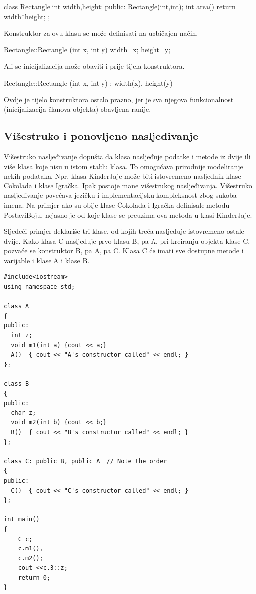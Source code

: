 \documentclass[11pt]{book}
\begin{document}
\begin{shortlisting}
  class Rectangle {
      int width,height;
      public:
      Rectangle(int,int);
      int area() {return width*height;}
    };
\end{shortlisting}

Konstruktor za ovu klasu se može definisati na uobičajen način.

\begin{shortlisting}
  Rectangle::Rectangle (int x, int y) { width=x; height=y; }
\end{shortlisting}

Ali se inicijalizacija može obaviti i prije tijela konstruktora.

\begin{shortlisting}
  Rectangle::Rectangle (int x, int y) : width(x), height(y) { }
\end{shortlisting}

Ovdje je tijelo konstruktora ostalo prazno, jer je sva njegova funkcionalnost (inicijalizacija članova objekta) obavljena ranije.

\subsection{Višestruko i ponovljeno nasljeđivanje}
Višestruko nasljeđivanje dopušta da klasa nasljeđuje podatke i metode iz dvije ili više klasa koje nisu u istom stablu klasa. To omogućava prirodnije modeliranje nekih podataka. Npr. klasa KinderJaje može biti istovremeno nasljednik klase Čokolada i klase Igračka. Ipak  postoje  mane  višestrukog  nasljeđivanja.  Višestruko  nasljeđivanje  povećava  jezičku  i implementacijsku kompleksnost zbog sukoba imena. Na primjer ako su obije klase Čokolada i Igračka definisale metodu PostaviBoju, nejasno je od koje klase se preuzima ova metoda u klasi KinderJaje.

Sljedeći primjer deklariše tri klase, od kojih treća nasljeđuje istovremeno ostale dvije. Kako klasa C nasljeđuje prvo klasu B, pa A, pri kreiranju objekta klase C, pozvaće se konstruktor B, pa A, pa C. Klasa C će imati sve dostupne metode i varijable i klase A i klase B.

\begin{lstlisting}
#include<iostream> 
using namespace std; 
  
class A 
{ 
public:
  int z;
  void m1(int a) {cout << a;}
  A()  { cout << "A's constructor called" << endl; } 
}; 
  
class B 
{ 
public: 
  char z;
  void m2(int b) {cout << b;}
  B()  { cout << "B's constructor called" << endl; } 
}; 
  
class C: public B, public A  // Note the order 
{ 
public: 
  C()  { cout << "C's constructor called" << endl; } 
}; 
  
int main() 
{ 
    C c; 
    c.m1();
    c.m2();
    cout <<c.B::z;
    return 0; 
} 
\end{lstlisting}
\end{document}
